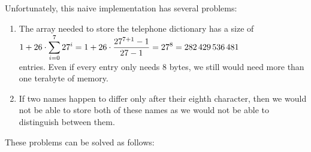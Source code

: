 \noindent
Unfortunately, this naive implementation has several problems: 
\begin{enumerate}
\item The array needed to store the telephone dictionary has a size of 
      \\[0.2cm]
      \hspace*{1.3cm}
      $\displaystyle 1 + 26 \cdot \sum\limits_{i=0}^7 27^i = 1 + 26 \cdot \frac{27^{7+1} - 1}{27 - 1} = 27^8 = 282\,429\,536\,481$ 
      \\[0.2cm]
      entries.  Even if every entry only needs 8 bytes, we still would need more than one terabyte
      of memory.
\item If two names happen to differ only after their eighth character, then we would not be able to
      store both of these names as we would not be able to distinguish between them.
\end{enumerate}
These problems can be solved as follows:
